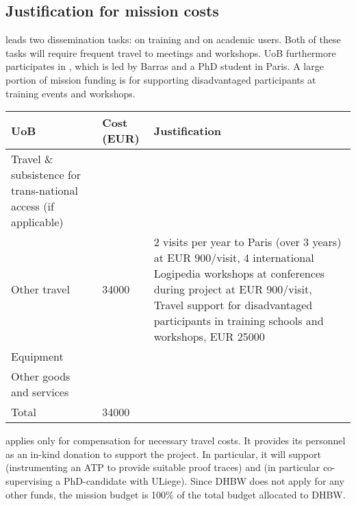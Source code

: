 \subsection*{Justification for mission costs}

leads two dissemination tasks: 
 on training and 
 on academic users.
Both of these tasks will require frequent travel to meetings and workshops.
UoB furthermore participates in , which is led by Barras and a PhD student in Paris. A large portion of mission funding is for supporting disadvantaged participants at training events and workshops.

\begin{center}
\begin{tabular}{|p{9em}|l|p{}|}
\hline
  UoB & Cost (EUR)  & Justification \\
  \hline
  Travel \& subsistence for trans-national access (if applicable) & & \\
  \hline
  Other travel & 34000 & 2 visits per year to Paris (over 3 years) at EUR 900/visit,
                         4 international Logipedia workshops at conferences during project at EUR 900/visit,
                         Travel support for disadvantaged participants in training schools and workshops, EUR 25000
  \\                         
  \hline
  Equipment & & \\
  \hline
  Other goods and services & & \\
  \hline
  \hline
  Total & 34000 & \\
  \hline
\end{tabular}
\end{center}

applies only for compensation for necessary travel costs. It
provides its personnel as an in-kind donation to support the
project. In particular, it will support  (instrumenting
an ATP to provide suitable proof traces) and  (in
particular co-supervising a PhD-candidate with ULiege). Since DHBW does
not apply for any other funds, the mission budget is 100\% of the
total budget allocated to DHBW.

